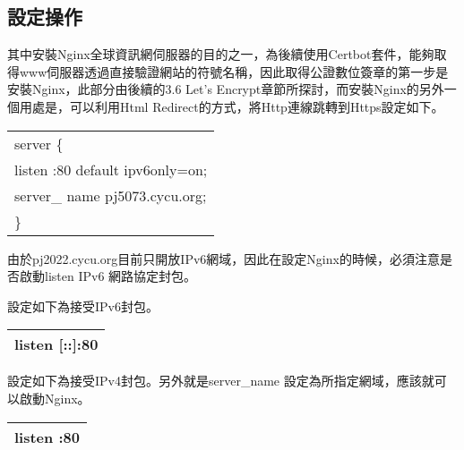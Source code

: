 \renewcommand{\baselinestretch}{20} %
\subsection{設定操作}
\par
\renewcommand{\baselinestretch}{1} %
\twelve 其中安裝Nginx全球資訊網伺服器的目的之一，為後續使用Certbot套件，能夠取得www伺服器透過直接驗證網站的符號名稱，因此取得公證數位簽章的第一步是安裝Nginx，此部分由後續的3.6 Let's Encrypt章節所探討，而安裝Nginx的另外一個用處是，可以利用Html Redirect的方式，將Http連線跳轉到Https設定如下。
\\
\begin{center}
\begin{tabular}{||p{15cm}|} %
\hline
server \{
\\
\qquad listen \qquad \qquad [::]:80 default ipv6only=on;
\\
\qquad server\_ name \quad pj5073.cycu.org;
\\
\}
\\
\hline
\end{tabular}
\end{center}
\par
\renewcommand{\baselinestretch}{1} %
\twelve 由於pj2022.cycu.org目前只開放IPv6網域，因此在設定Nginx的時候，必須注意是否啟動listen IPv6 網路協定封包。
\par
\renewcommand{\baselinestretch}{1} %
\twelve 設定如下為接受IPv6封包。
\par
\begin{center}
\begin{tabular}{||p{15cm}|} %
\hline
listen [::]:80
\\
\hline
\end{tabular}
\end{center}
\par
\renewcommand{\baselinestretch}{1} %
\twelve 設定如下為接受IPv4封包。另外就是server\_name 設定為所指定網域，應該就可以啟動Nginx。
\par
\begin{center}
\begin{tabular}{||p{15cm}|} %
\hline
listen :80
\\
\hline
\end{tabular}
\end{center}
\par

\renewcommand{\baselinestretch}{20} %
